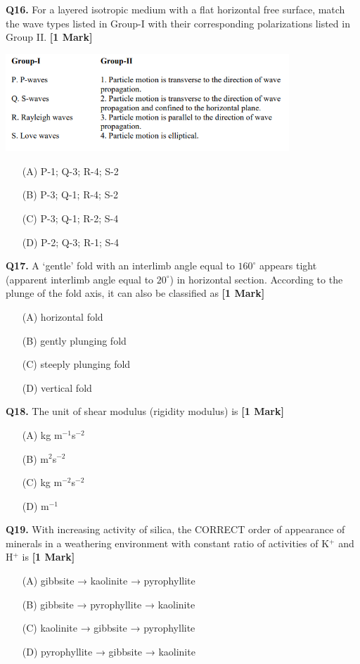 \documentclass[11pt]{article}
\newcommand{\questiona}[2]{
    \noindent\textbf{Q#2.} #1 \hfill \textbf{[1 Mark]}
}
\begin{document}
\questiona{For a layered isotropic medium with a flat horizontal free surface, match the wave types listed in Group-I with their corresponding polarizations listed in Group II.}{16}
\begin{center}
\includegraphics[width=0.8\textwidth]{figures/16.png}
\end{center}
\begin{enumerate}
    \item[(A)] P-1; Q-3; R-4; S-2
    \item[(B)] P-3; Q-1; R-4; S-2
    \item[(C)] P-3; Q-1; R-2; S-4
    \item[(D)] P-2; Q-3; R-1; S-4
\end{enumerate}
\vspace{0.5cm}

\questiona{A ‘gentle’ fold with an interlimb angle equal to \(160^\circ\) appears tight (apparent interlimb angle equal to \(20^\circ\)) in horizontal section. According to the plunge of the fold axis, it can also be classified as}{17}
\begin{enumerate}
    \item[(A)] horizontal fold
    \item[(B)] gently plunging fold
    \item[(C)] steeply plunging fold
    \item[(D)] vertical fold
\end{enumerate}
\vspace{0.5cm}

\questiona{The unit of shear modulus (rigidity modulus) is}{18}
\begin{enumerate}
    \item[(A)] kg m\(^{-1}\)s\(^{-2}\)
    \item[(B)] m\(^2\)s\(^{-2}\)
    \item[(C)] kg m\(^{-2}\)s\(^{-2}\)
    \item[(D)] m\(^{-1}\)
\end{enumerate}
\vspace{0.5cm}

\questiona{With increasing activity of silica, the CORRECT order of appearance of minerals in a weathering environment with constant ratio of activities of K\(^+\) and H\(^+\) is}{19}
\begin{enumerate}
    \item[(A)] gibbsite → kaolinite → pyrophyllite
    \item[(B)] gibbsite → pyrophyllite → kaolinite
    \item[(C)] kaolinite → gibbsite → pyrophyllite
    \item[(D)] pyrophyllite → gibbsite → kaolinite
\end{enumerate}
\vspace{0.5cm}
\end{document}
